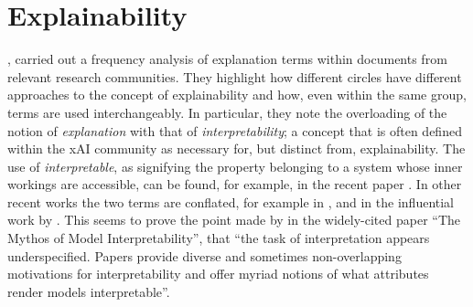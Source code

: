 \section{Explainability} \label{sec:explainability}
\citet{Doran2018}, carried out a frequency analysis of explanation terms within documents from relevant research communities.
They highlight how different circles have different approaches to the concept of explainability and how, even within the same group, terms are used interchangeably.
In particular, they note the overloading of the notion of \textit{explanation} with that of \textit{interpretability}; a concept that is often defined within the xAI community as necessary for, but distinct from, explainability.
The use of \textit{interpretable}, as signifying the property belonging to a system whose inner workings are accessible, can be found, for example, in the recent paper \citep{gilpin2018explaining}.
In other recent works the two terms are conflated, for example in \citep{mittelstadt2019explaining}, \citep{guidotti2018survey} and in the influential work by \citet{doshi2017towards}.
This seems to prove the point made by \citet{Lipton2016} in the widely-cited paper \enquote{The Mythos of Model Interpretability}, that \enquote{the task of interpretation appears underspecified. Papers provide diverse and sometimes non-overlapping motivations for interpretability and offer myriad notions of what attributes render models interpretable}.

